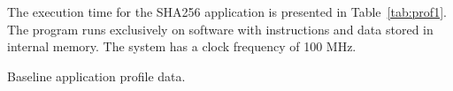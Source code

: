 The execution time for the SHA256 application is presented in
Table~\ref{tab:prof1}. The program runs exclusively on software with
instructions and data stored in internal memory. The system has a clock
frequency of 100 MHz.

\begin{table}[h]
    \centering
    
    \caption{Baseline application profile data.}
    \label{tab:prof1}
\end{table}

